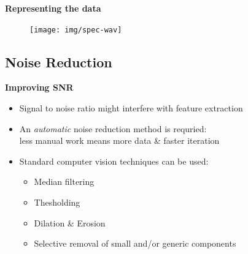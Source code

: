 \documentclass[t, xcolor={dvipsnames}]{beamer}
\begin{document}
\begin{frame}[fragile]
  \vspace{0.5cm}
  {\bfseries\Large Representing the data}
  \vspace{-0.20cm}
  \begin{figure}
    \texttt{[image: img/spec-wav]}
  \end{figure}
\end{frame}



\subsection{Noise Reduction}

\begin{frame}[fragile]
  \vspace{0.5cm}
  {\bfseries\Large Improving SNR}\\
  \vspace{0.5cm}
  \begin{addmargin}{0.5cm}
    \begin{itemize}
      \item Signal to noise ratio might interfere with feature extraction
      \item An \emph{automatic} noise reduction method is requried: \\
        less manual work means more data \& faster iteration
      \item Standard computer vision techniques can be used:
      \begin{itemize}
        \item Median filtering
        \item Thesholding
        \item Dilation \& Erosion
        \item Selective removal of small and/or generic components
      \end{itemize}
    \end{itemize}
  \end{addmargin}
\end{frame}
\end{document}
